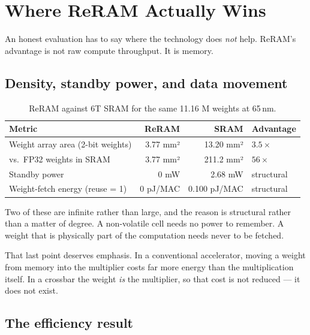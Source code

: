 \documentclass[11pt,a4paper]{report}
\begin{document}
\chapter{Where ReRAM Actually Wins}

An honest evaluation has to say where the technology does \emph{not} help.
ReRAM's advantage is not raw compute throughput. It is memory.

\section{Density, standby power, and data movement}

\begin{table}[h]
\centering
\caption{ReRAM against 6T SRAM for the same 11.16 M weights at 65\,nm.}
\begin{tabular}{lrrl}
\toprule
Metric & ReRAM & SRAM & Advantage \\
\midrule
Weight array area (2-bit weights) & 3.77 mm² & 13.20 mm² & $3.5\times$ \\
vs.\ FP32 weights in SRAM & 3.77 mm² & 211.2 mm² & $56\times$ \\
Standby power & 0 mW & 2.68 mW & structural \\
Weight-fetch energy (reuse = 1) & 0 pJ/MAC & 0.100 pJ/MAC & structural \\
\bottomrule
\end{tabular}
\end{table}

Two of these are infinite rather than large, and the reason is structural
rather than a matter of degree. A non-volatile cell needs no power to
remember. A weight that is physically part of the computation needs never to
be fetched.

That last point deserves emphasis. In a conventional accelerator, moving a
weight from memory into the multiplier costs far more energy than the
multiplication itself. In a crossbar the weight \emph{is} the multiplier, so
that cost is not reduced --- it does not exist.

\section{The efficiency result}
\end{document}
